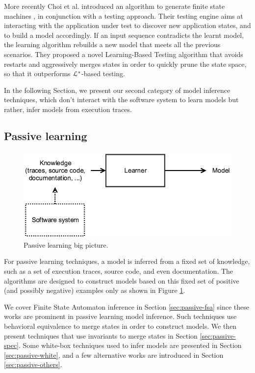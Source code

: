 More recently Choi et al. introduced an algorithm to generate
finite state machines \cite{Choi2013}, in conjunction with a
testing approach.  Their testing engine aims at interacting with
the application under test to discover new application states,
and to build a model accordingly. If an input sequence
contradicts the learnt model, the learning algorithm rebuilds a
new model that meets all the previous scenarios. They proposed a
novel Learning-Based Testing algorithm that avoids restarts and
aggressively merges states in order to quickly prune the state
space, so that it outperforms $\EuScript{L}^*$-based testing.

In the following Section, we present our second category of model
inference techniques, which don't interact with the software
system to learn models but rather, infer models from execution
traces.


\subsection{Passive learning}
\label{sec:passive}

\begin{figure}[h]
    \begin{center}
        \includegraphics[width=0.9\linewidth]{figures/passive.png}
    \end{center}

    \caption{Passive learning big picture.}
    \label{fig:passive}
\end{figure}

For passive learning techniques, a model is inferred from a fixed
set of knowledge, such as a set of execution traces, source code,
and even documentation. The algorithms are designed to construct
models based on this fixed set of positive (and possibly
negative) examples only as shown in Figure \ref{fig:passive}.

We cover Finite State Automaton inference in Section
\ref{sec:passive-fsa} since these works are prominent in passive
learning model inference. Such techniques use behavioral
equivalence to merge states in order to construct models.
We then present techniques that use invariants to merge states in
Section \ref{sec:passive-spec}. Some white-box techniques used to
infer models are presented in Section \ref{sec:passive-white},
and a few alternative works are introduced in Section
\ref{sec:passive-others}.


